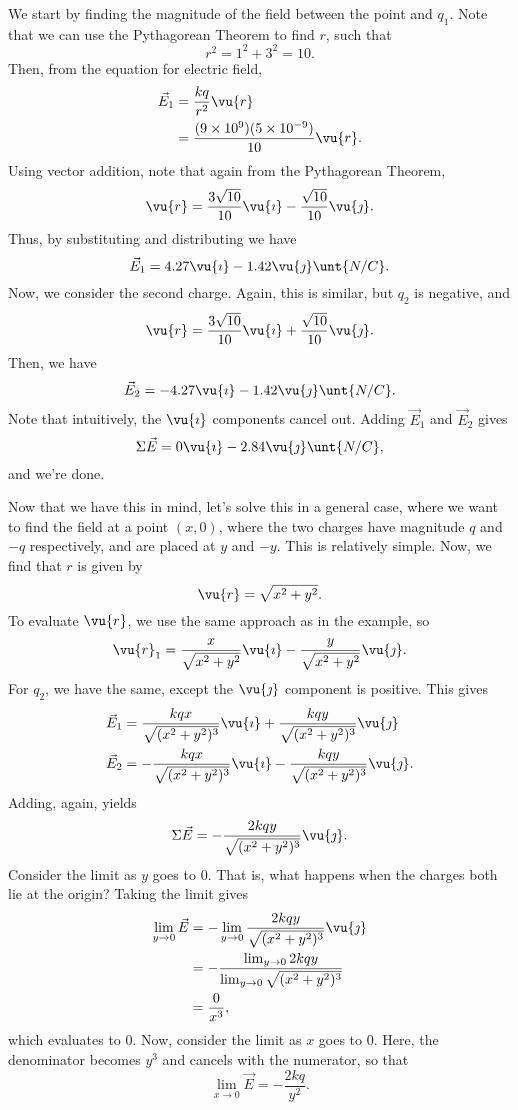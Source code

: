 \documentclass[11pt]{article}
\begin{document}
\begin{solution}
	We start by finding the magnitude of the field between the point and $q_1$. Note that we can use the Pythagorean Theorem to find $r$, such that
	\[r^2 = 1^2 + 3^2 = 10.\]
	Then, from the equation for electric field,
	\begin{align*}
		\vec{E}_1 &= \frac{kq}{r^2}\vu{r} \\
		&= \frac{(9\times 10^9)(5\times 10^{-9})}{10}\vu{r}.
	\end{align*}
	Using vector addition, note that again from the Pythagorean Theorem,
	\[\vu{r} = \frac{3\sqrt{10}}{10}\vu{\imath} - \frac{\sqrt{10}}{10}\vu{\jmath}.\]
	Thus, by substituting and distributing we have
	\[\vec{E}_1 = 4.27\vu{\imath} - 1.42\vu{\jmath} \unt{N/C}.\]
	Now, we consider the second charge. Again, this is similar, but $q_2$ is negative, and
	\[\vu{r} = \frac{3\sqrt{10}}{10}\vu{\imath} + \frac{\sqrt{10}}{10}\vu{\jmath}.\]
	Then, we have
	\[\vec{E}_2 = -4.27\vu{\imath} - 1.42\vu{\jmath}\unt{N/C}.\]
	Note that intuitively, the $\vu{\imath}$ components cancel out. Adding $\vec{E}_1$ and $\vec{E}_2$ gives
	\[\Sigma \vec{E} = 0\vu{\imath} - 2.84\vu{\jmath}\unt{N/C},\]
	and we're done.
\end{solution}
Now that we have this in mind, let's solve this in a general case, where we want to find the field at a point $(x, 0)$, where the two charges have magnitude $q$ and $-q$ respectively, and are placed at $y$ and $-y$. This is relatively simple. Now, we find that $r$ is given by
	\[\vu{r} = \sqrt{x^2 + y^2}.\]
	To evaluate $\vu{r}$, we use the same approach as in the example, so
	\[\vu{r}_1 = \frac{x}{\sqrt{x^2+y^2}}\vu{\imath} - \frac{y}{\sqrt{x^2+y^2}}\vu{\jmath}.\]
	For $q_2$, we have the same, except the $\vu{\jmath}$ component is positive. This gives
	\begin{align*}
		\vec{E}_1 &= \frac{kqx}{\sqrt{(x^2+y^2)^3}}\vu{\imath} + \frac{kqy}{\sqrt{(x^2+y^2)^3}}\vu{\jmath} \\
		\vec{E}_2 &= -\frac{kqx}{\sqrt{(x^2+y^2)^3}}\vu{\imath} - \frac{kqy}{\sqrt{(x^2+y^2)^3}}\vu{\jmath}.
	\end{align*}
	Adding, again, yields
	\[\Sigma \vec{E} = -\frac{2kqy}{\sqrt{(x^2+y^2)^3}}\vu{\jmath}.\]
	Consider the limit as $y$ goes to $0$. That is, what happens when the charges both lie at the origin? Taking the limit gives
	\begin{align*}
		\lim_{y\to 0} \vec{E} &= -\lim_{y\to 0}\frac{2kqy}{\sqrt{(x^2+y^2)^3}}\vu{\jmath} \\
		&= -\frac{\lim_{y\to 0} 2kqy}{\lim_{y\to 0}\sqrt{(x^2+y^2)^3}} \\
		&= \frac{0}{x^3},
	\end{align*}
	which evaluates to 0. Now, consider the limit as $x$ goes to 0. Here, the denominator becomes $y^3$ and cancels with the numerator, so that
	\[\lim_{x\to 0} \vec{E} = -\frac{2kq}{y^2}.\]
\end{document}
